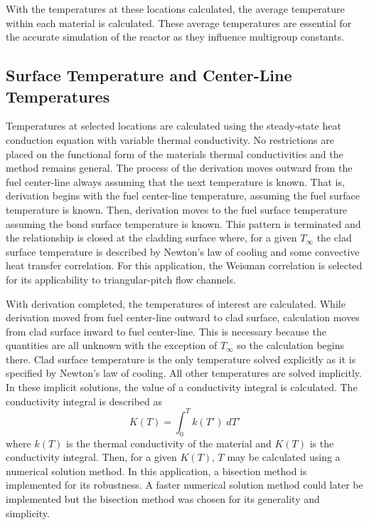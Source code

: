   With the
  temperatures at these locations calculated, the average temperature within
  each material is calculated. These average temperatures are essential for the
  accurate simulation of the reactor as they influence multigroup constants.

  \subsection{Surface Temperature and Center-Line Temperatures}
    \label{sec:surface_temps}
    Temperatures at selected locations are calculated using the steady-state
    heat conduction equation with variable thermal conductivity. No restrictions
    are placed on the functional form of the materials thermal conductivities
    and the method remains general. The process of the derivation moves outward
    from the fuel center-line always assuming that the next temperature is
    known. That is, derivation begins with the fuel center-line temperature,
    assuming the fuel surface temperature is known. Then, derivation moves to
    the fuel surface temperature assuming the bond surface temperature is known.
    This pattern is terminated and the relationship is closed at the cladding
    surface where, for a given $T_{\infty}$ the clad surface temperature is
    described by Newton's law of cooling and some convective heat transfer
    correlation. For this application, the Weisman correlation is selected for
    its applicability to triangular-pitch flow channels.

    With derivation completed, the temperatures of interest are calculated.
    While derivation moved from fuel center-line outward to clad surface,
    calculation moves from clad surface inward to fuel center-line. This is
    necessary because the quantities are all unknown with the exception of
    $T_{\infty}$ so the calculation begins there. Clad surface temperature is 
    the only temperature solved explicitly as it is specified by Newton's law of
    cooling. All other temperatures are solved implicitly. In these implicit
    solutions, the value of a conductivity integral is calculated. The 
    conductivity integral is described as
    \begin{equation}
      \label{eq:conductivity_integral}
      K(T) = \int_0^T k(T') \; dT'
    \end{equation}
    where $k(T)$ is the thermal conductivity of the material and $K(T)$ is the
    conductivity integral. Then, for a given $K(T)$, $T$ may be calculated using
    a numerical solution method. In this application, a bisection method is 
    implemented for its robustness. A faster numerical solution method could 
    later be implemented but the bisection method was chosen for its generality
    and simplicity.

